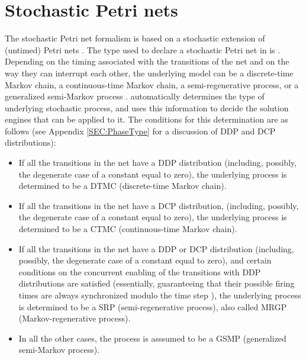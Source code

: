 %
%

\chapter{Stochastic Petri nets}  \label{SEC:SPN}


The stochastic Petri net
formalism is based on a stochastic extension of
(untimed) Petri nets \cite{Murata1989,Peterson1981,Petri1962,Reisig1985}.
The type used to declare a stochastic Petri net in {\smart} is
.
Depending on the timing associated with the transitions of the
net and on the way they can interrupt each other,
the underlying model can be a discrete-time Markov chain, a continuous-time
Markov chain, a semi-regenerative process,
or a generalized semi-Markov process
\cite{Ajmone1984,Chiola1993b,1995StewartBook-DiscreteSPN,1993IMA-SRNs,
1994IEEETSE-SPNcharacterization,Molloy1981,Natkin1980}.
{\smart} automatically determines the type of underlying stochastic process,
and uses this information to decide the solution engines that can be
applied to it.
The conditions for this determination are as follows (see
Appendix \ref{SEC:PhaseType} for a discussion of DDP and DCP distributions):
\begin{itemize}
\item
If all the transitions in the net have a DDP distribution
(including, possibly, the degenerate case of a constant equal to zero),
the underlying process is determined to be a DTMC (discrete-time Markov chain).
\item
If all the transitions in the net have a DCP distribution,
(including, possibly, the degenerate case of a constant equal to zero),
the underlying
process is determined to be a CTMC (continuous-time Markov chain).
\item
If all the transitions in the net have a DDP or DCP distribution
(including, possibly, the degenerate case of a constant equal to zero),
and certain conditions on the concurrent enabling of the transitions
with DDP distributions are satisfied (essentially, guaranteeing that their
possible firing times are always synchronized modulo the time step
\cite{Jones-NASA-00,2001PNPM-PDPN}), the underlying process is determined
to be a SRP (semi-regenerative process), also
called MRGP (Markov-regenerative process).
\item
In all the other cases, the process is asssumed to be a GSMP
(generalized semi-Markov process).
\end{itemize}

